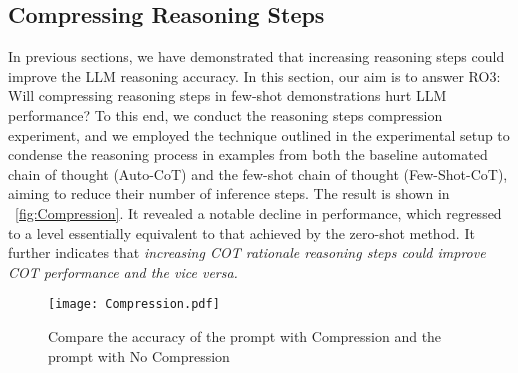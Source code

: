 \subsection{Compressing Reasoning Steps }
\label{section4.4}
\begin{table*}[!h]
\small
\caption{Making deliberate alterations to sample questions}
\end{table*}
In previous sections, we have demonstrated that increasing reasoning steps could improve the LLM reasoning accuracy. In this section, our aim is to answer RO3: Will compressing reasoning steps in few-shot demonstrations hurt LLM performance?
To this end, we conduct the reasoning steps compression experiment, and we employed the technique outlined in the experimental setup to condense the reasoning process in examples from both the baseline automated chain of thought (Auto-CoT) and the few-shot chain of thought (Few-Shot-CoT), aiming to reduce their number of inference steps. The result is shown in ~\autoref{fig:Compression}. It revealed a notable decline in performance, which regressed to a level essentially equivalent to that achieved by the zero-shot method. It further indicates that \emph{increasing COT rationale reasoning steps could improve COT performance and the vice versa.}
\begin{figure}[t]
    \centering
    \texttt{[image: Compression.pdf]}
   \caption{Compare the accuracy of the prompt with Compression and the prompt with No Compression}
    \label{fig:Compression}
\end{figure}

